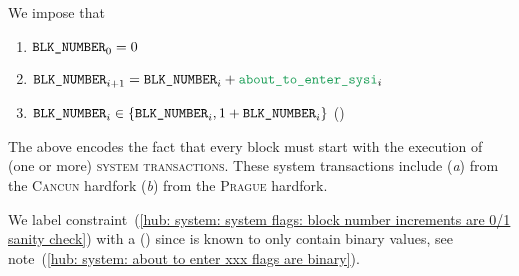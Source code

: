 We impose that
\begin{enumerate}
        \item $\texttt{BLK\_NUMBER} _{0} = 0$
	\item $\blockNumber _{i + 1} = \blockNumber _{i} + \aboutToEnterSystemInit _{i}$
	\item \label{hub: system: system flags: block number increments are 0/1 sanity check} $\texttt{BLK\_NUMBER} _{i} \in \{ \texttt{BLK\_NUMBER} _{i}, 1 + \texttt{BLK\_NUMBER} _{i} \}$ (\sanityCheck)
\end{enumerate}
\saNote{} \label{hub: system: system flags: block number increments and initial system transactions}
The above encodes the fact that every block must start with the execution of (one or more) \textsc{system transactions}.
These system transactions include
(\emph{a}) \cite{EIP-4788} from the \textsc{Cancun} hardfork
(\emph{b}) \cite{EIP-2935} from the \textsc{Prague} hardfork.

\saNote{}
We label constraint~(\ref{hub: system: system flags: block number increments are 0/1 sanity check}) with a (\sanityCheck) since
\aboutToEnterSystemInit{} is known to only contain binary values,
see note~(\ref{hub: system: about to enter xxx flags are binary}).
